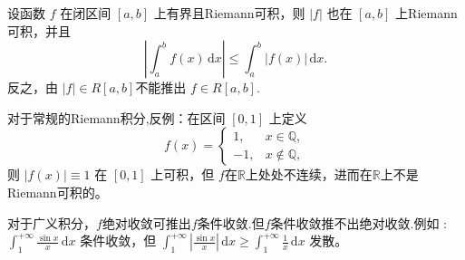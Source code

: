 \documentclass[../../main.tex]{subfiles}%
\begin{document}
\begin{theorem}[Riemann可积函数必绝对可积]\label{theorem:Riemann可积函数必绝对可积}
设函数 $f$ 在闭区间 $[a,b]$ 上有界且Riemann可积，则 $|f|$ 也在 $[a,b]$ 上Riemann可积，并且
\[
\left| \int_a^b f(x)\,\mathrm{d}x \right| \leqslant \int_a^b |f(x)|\,\mathrm{d}x.
\]
反之，由 $|f|\in R[a,b]$不能推出 $f\in R[a,b]$.
\end{theorem}
\begin{remark}
对于常规的Riemann积分,反例：在区间 $[0,1]$ 上定义
\[
f(x) = \begin{cases}
1, & x \in \mathbb{Q},\\
-1, & x \notin \mathbb{Q},
\end{cases}
\]
则 $|f(x)| \equiv 1$ 在 $[0,1]$ 上可积，但 $f$在$\mathbb{R}$上处处不连续，进而在$\mathbb{R}$上不是Riemann可积的。
\end{remark}
\begin{remark}
对于广义积分，$f$绝对收敛可推出$f$条件收敛.但$f$条件收敛推不出绝对收敛.例如 :$\int_1^{+\infty} \frac{\sin x}{x}\,\mathrm{d}x$ 条件收敛，但 $\int_1^{+\infty} \left|\frac{\sin x}{x}\right|\,\mathrm{d}x\geqslant \int_1^{+\infty} \frac{1}{x}\,\mathrm{d}x$ 发散。
\end{remark}
\end{document}
